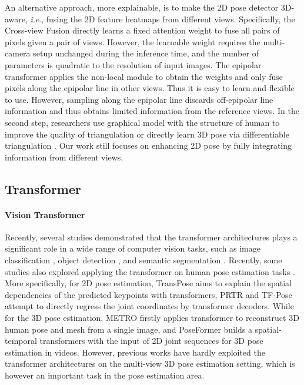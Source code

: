 \documentclass{bmvc2k}
\newcommand{\ie}{\textit{i}.\textit{e}., }
\begin{document}
An alternative approach, more explainable, is to make the 2D pose detector 3D-aware, \ie fusing the 2D feature heatmaps \cite{qiu2019cross, zhang2021adafuse, xie2020metafuse, chen2021mvhm, he2020epipolar} from different views. 
Specifically, the Cross-view Fusion \cite{qiu2019cross} directly learns a fixed attention weight to fuse all pairs of pixels given a pair of views. However, the learnable weight requires the multi-camera setup unchanged during the inference time, and the number of parameters is quadratic to the resolution of input images. 
The epipolar transformer \cite{he2020epipolar} applies the non-local module \cite{wang2018non} to obtain the weights and only fuse pixels along the epipolar line in other views. Thus it is easy to learn and flexible to use. 
However, sampling along the epipolar line discards off-epipolar line information and thus obtains limited information from the reference views.
In the second step, researchers use graphical model with the structure of human \cite{qiu2019cross} to improve the quality of triangulation or directly learn 3D pose via differentiable triangulation \cite{iskakov2019learnable}. 
Our work still focuses on enhancing 2D pose by fully integrating information from different views. 


\vspace{-1.0em}
\subsection{Transformer}
\vspace{-0.5em}
\paragraph{Vision Transformer} Recently, several studies demonstrated that the transformer architectures \cite{vaswani2017attention} plays a significant role in a wide range of computer vision tasks, such as image classification \cite{dosovitskiy2020image, touvron2020training, chen2021crossvit}, object detection \cite{carion2020end, zhu2020deformable}, and semantic segmentation \cite{zheng2020rethinking, wang2020end, yan2022after}. 
Recently, some studies also explored applying the transformer on human pose estimation tasks \cite{yang2020transpose,li2021pose, mao2021tfpose, lin2020end, zheng20213d}. 
More specifically, for 2D pose estimation, TransPose \cite{yang2020transpose} aims to explain the spatial dependencies of the predicted keypoints with transformers, PRTR \cite{li2021pose} and TF-Pose \cite{mao2021tfpose} attempt to directly regress the joint coordinates by transformer decoders. 
While for the 3D pose estimation, METRO \cite{lin2020end} firstly applies transformer to reconstruct 3D human pose and mesh from a single image, and PoseFormer \cite{zheng20213d} builds a spatial-temporal transformers with the input of 2D joint sequences for 3D pose estimation in videos. 
However, previous works have hardly exploited the transformer architectures on the multi-view 3D pose estimation setting, which is however an important task in the pose estimation area. 
\end{document}
